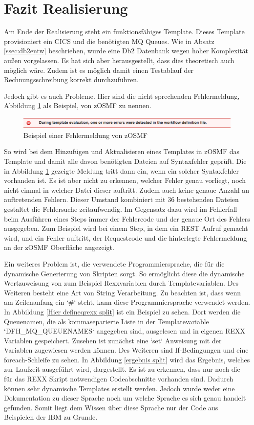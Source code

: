 \section{Fazit Realisierung}
Am Ende der Realisierung steht ein funktionsfähiges Template.
Dieses Template provisioniert ein CICS und die benötigten MQ Queues.
Wie in Absatz \ref{ssec:db2entw} beschrieben, wurde eine Db2 Datenbank wegen hoher Komplexität außen vorgelassen.
Es hat sich aber herausgestellt, dass dies theoretisch auch möglich wäre.
Zudem ist es möglich damit einen Testablauf der Rechnungsschreibung korrekt durchzuführen.

Jedoch gibt es auch Probleme.
Hier sind die nicht sprechenden Fehlermeldung, Abbildung \ref{fig:zosmffehler} als Beispiel, von zOSMF zu nennen.
\begin{figure}[h]
	\centering
	\includegraphics[width=\textwidth]{figures/zosmffehlermeldung.png}
	\caption{Beispiel einer Fehlermeldung von zOSMF}
	\label{fig:zosmffehler}
\end{figure}
So wird bei dem Hinzufügen und Aktualisieren eines Templates in zOSMF das Template und damit alle davon benötigten Dateien auf Syntaxfehler geprüft.
Die in Abbildung \ref{fig:zosmffehler} gezeigte Meldung tritt dann ein, wenn ein solcher Syntaxfehler vorhanden ist.
Es ist aber nicht zu erkennen, welcher Fehler genau vorliegt, noch nicht einmal in welcher Datei dieser auftritt.
Zudem auch keine genaue Anzahl an auftretenden Fehlern.
Dieser Umstand kombiniert mit 36 bestehenden Dateien gestaltet die Fehlersuche zeitaufwendig.
Im Gegensatz dazu wird im Fehlerfall beim Ausführen eines Steps immer der Fehlercode und der genaue Ort des Fehlers ausgegeben.
Zum Beispiel wird bei einem Step, in dem ein REST Aufruf gemacht wird, und ein Fehler auftritt, der Requestcode und die hinterlegte Fehlermeldung an der zOSMF Oberfläche angezeigt.

Ein weiteres Problem ist, die verwendete Programmiersprache, die für die dynamische Generierung von Skripten sorgt.
So ermöglicht diese die dynamische Wertzuweisung von zum Beispiel Rexxvariablen durch Templatevariablen.
Des Weiteren besteht eine Art von String Verarbeitung.
Zu beachten ist, dass wenn am Zeilenanfang ein `\#` steht, kann diese Programmiersprache verwendet werden.
In Abbildung \ref{Hier defineqrexx split} ist ein Beispiel zu sehen.
Dort werden die Queuenamen, die als kommaseparierte Liste in der Templatevariable `DFH\_MQ\_QUEUENAMES` angegeben sind, ausgelesen und in eigenen REXX Variablen gespeichert.
Zusehen ist zunächst eine `set` Anweisung mit der Variablen zugewiesen werden können.
Des Weiteren sind If-Bedingungen und eine foreach-Schleife zu sehen.
In Abbildung \ref{ergebnis split} wird das Ergebnis, welches zur Laufzeit ausgeführt wird, dargestellt.
Es ist zu erkennen, dass nur noch die für das REXX Skript notwendigen Codeabschnitte vorhanden sind.
Dadurch können sehr dynamische Templates erstellt werden.
Jedoch wurde weder eine Dokumentation zu dieser Sprache noch um welche Sprache es sich genau handelt gefunden.
Somit liegt dem Wissen über diese Sprache nur der Code aus Beispielen der IBM zu Grunde.

